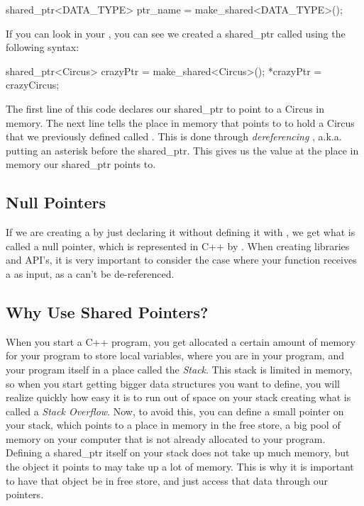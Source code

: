 \documentclass{tufte-handout}
\begin{document}
\begin{Code}
shared_ptr<DATA_TYPE> ptr_name = make_shared<DATA_TYPE>();
\end{Code}

\noindent
If you can look in your , you can see we created a shared\_ptr  called  using the following syntax:

\begin{Code}
shared_ptr<Circus> crazyPtr = make_shared<Circus>();
*crazyPtr = crazyCircus;
\end{Code}

\noindent
The first line of this code declares our shared\_ptr to point to a Circus in memory. 
The next line tells the place in memory that   points to to hold a Circus that we previously defined called .  
This is done through \textit{dereferencing} , a.k.a. putting an asterisk before the shared\_ptr.  
This gives us the value at the place in memory our shared\_ptr points to.

\subsection{Null Pointers}

If we are creating a  by just declaring it without defining it with , we get what is called a null pointer, which is represented in C++ by .
When creating libraries and API's, it is very important to consider the case where your function receives a  as input, as a  can't be de-referenced.

\subsection{Why Use Shared Pointers?}
When you start a C++ program, you get allocated a certain amount of
memory for your program to store local variables, where you are in your
program, and your program itself in a place called the \textit{Stack}.%
This stack is limited in memory, so when you start getting bigger data structures you want to define, you will realize quickly how easy it is to run out of space on your stack creating what is called a \textit{Stack Overflow}.
Now, to avoid this, you can define a small pointer on your stack, which points to a place in memory in the free store, a big pool of memory on your computer that is not already allocated to your program.
Defining a shared\_ptr itself on your stack does not take up much memory, but the object it points to may take up a lot of memory.  
This is why it is important to have that object be in free store, and just access that data through our pointers.
\end{document}
